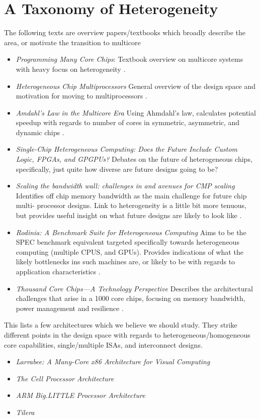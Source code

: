  \section{A Taxonomy of Heterogeneity}

The following texts are overview papers/textbooks which
broadly describe the area, or motivate the transition
to multicore
\begin{itemize}
\item \emph{Programming Many Core Chips}: Textbook overview
on multicore systems with heavy focus on heterogeneity \cite{Vajda:1414193}.

\item \emph{Heterogeneous Chip Multiprocessors} General overview
of the design space and motivation for moving to multiprocessors \cite{Kumar:2005:HCM:1100859.1100890}.
\item \emph{Amdahl's Law in the Multicore Era} Using Ahmdahl's law,
calculates potential speedup with regards to number of cores
in symmetric, asymmetric, and dynamic chips \cite{4563876}.
\item \emph{Single-Chip Heterogeneous Computing: Does the Future Include Custom 
Logic, FPGAs, and GPGPUs?} Debates on the future 
of heterogeneous chips, specifically, just quite how diverse
are future designs going to be? \cite{5695539}
\item \emph{Scaling the bandwidth wall: challenges in and avenues for CMP scaling}
Identifies off chip memory bandwidth as the main challenge for future chip multi-
processor designs. Link to heterogeneity is a little bit more tenuous, but
provides useful insight on what future designs are likely to look like \cite{Rogers_scalingthe}.
\item \emph{Rodinia: A Benchmark Suite for Heterogeneous Computing} Aims
to be the SPEC benchmark equivalent targeted specifically towards heterogeneous
computing (multiple CPUS, and GPUs). Provides indications of what the likely
bottlenecks ins such machines are, or likely to be with regards to application
characteristics \cite{5306797}.
\item \emph{Thousand Core Chips—A Technology Perspective} Describes the
architectural challenges that arise in a 1000 core chips, focusing
on memory bandwidth, power management and resilience \cite{Borkar:2007:TCC:1278480.1278667}.

\end{itemize}

This lists a few architectures which we believe we should study. They
strike different points in the design space with regards to heterogeneous/homogeneous
core capabilities, single/multiple ISAs, and interconnect designs. 
\begin{itemize}
\item \emph{Larrabee: A Many-Core x86 Architecture for Visual Computing} \cite{4796165}
\item \emph{The Cell Processor Architecture} \cite{1540943}
\item \emph{ARM Big.LITTLE Processor Architecture} \cite{ABL}
\item \emph{Tilera} \cite{Wentzlaff:2007:OIA:1320302.1320834}
\end{itemize}

